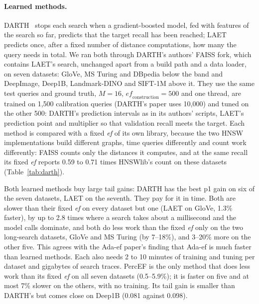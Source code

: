 \documentclass[sigconf,anonymous]{acmart}
\newcommand{\ef}{\textit{ef}}
\begin{document}
\paragraph{Learned methods.}
DARTH~\cite{chatzakis2026darth} stops each search when a gradient-boosted model, fed with features
of the search so far, predicts that the target recall has been reached; LAET~\cite{li2020laet}
predicts once, after a fixed number of distance computations, how many the query needs in total.
We ran both through DARTH's authors' FAISS fork, which contains LAET's search, unchanged apart from
a build path and a data loader, on seven datasets: GloVe, MS Turing and DBpedia below the band and
DeepImage, Deep1B, Landmark-DINO and SIFT-1M above it. They use the same test queries and ground
truth, $M = 16$, $\mathit{ef}_{\mathrm{construction}} = 500$ and one thread, are trained on 1,500
calibration queries (DARTH's paper uses 10,000) and tuned on the other 500: DARTH's prediction
intervals as in its authors' scripts, LAET's prediction point and multiplier so that validation
recall meets the target. Each method is compared with a fixed \ef{} of its own library, because the
two HNSW implementations build different graphs, time queries differently and count work
differently: FAISS counts only the distances it computes, and at the same recall its fixed \ef{}
reports 0.59 to 0.71 times HNSWlib's count on these datasets (Table~\ref{tab:darth}).

Both learned methods buy large tail gains: DARTH has the best p1 gain on six of the seven datasets,
LAET on the seventh. They pay for it in time. Both are slower than their fixed \ef{} on every
dataset but one (LAET on GloVe, 1.3\% faster), by up to 2.8 times where a search takes about a
millisecond and the model calls dominate, and both do less work than the fixed \ef{} only on the
two long-search datasets, GloVe and MS Turing (by 7--18\%), and 3--20\% more on the other five. This
agrees with the Ada-ef paper's finding that Ada-ef is much faster than learned methods. Each also
needs 2 to 10 minutes of training and tuning per dataset and gigabytes of search traces. PercEF is
the only method that does less work than its fixed \ef{} on all seven datasets (0.5--5.9\%); it is
faster on five and at most 7\% slower on the others, with no training. Its tail gain is smaller than
DARTH's but comes close on Deep1B (0.081 against 0.098).
\end{document}
